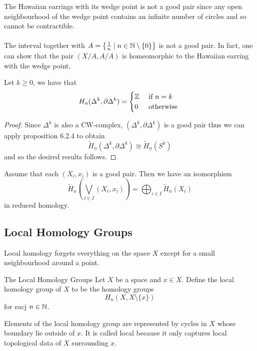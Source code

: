\documentclass[a4paper]{article}
\begin{document}
The Hawaiian earrings with its wedge point is not a good pair since any open neighbourhood of the wedge point contains an infinite number of circles and so cannot be contractible. \\~\\

The interval together with $A=\left\{\frac{1}{n}\;|\;n\in\mathbb{N}\setminus\{0\}\right\}$ is not a good pair. In fact, one can show that the pair $(X/A,A/A)$ is homeomorphic to the Hawaiian earring with the wedge point. 

\begin{prp}{}{} Let $k\geq 0$, we have that $$H_n(\Delta^k,\partial\Delta^k)=\begin{cases}
\mathbb{Z} & \text{ if } n=k\\
0 & \text{ otherwise }
\end{cases}$$ \tcbline
\begin{proof}
Since $\Delta^k$ is also a CW-complex, $(\Delta^k,\partial\Delta^k)$ is a good pair thus we can apply proposition 6.2.4 to obtain $$\widetilde{H}_n(\Delta^k,\partial\Delta^k)\cong\tilde{H}_n(S^k)$$ and so the desired results follows. 
\end{proof}
\end{prp}

\begin{lmm}{}{} Assume that each $(X_i,x_i)$ is a good pair. Then we have an isomorphism $$\widetilde{H}_n\left(\bigvee_{i\in I}(X_i,x_i)\right)=\bigoplus_{i\in I}\widetilde{H}_n(X_i)$$ in reduced homology. 
\end{lmm}

\subsection{Local Homology Groups}
Local homology forgets everything on the space $X$ except for a small neighbourhood around a point. 

\begin{defn}{The Local Homology Groups}{} Let $X$ be a space and $x\in X$. Define the local homology group of $X$ to be the homology groups $$H_n(X,X\setminus\{x\})$$ for eacj $n\in\mathbb{N}$. 
\end{defn}

Elements of the local homology group are represented by cycles in $X$ whose boundary lie outside of $x$. It is called local because it only captures local topological data of $X$ surrounding $x$. 
\end{document}
